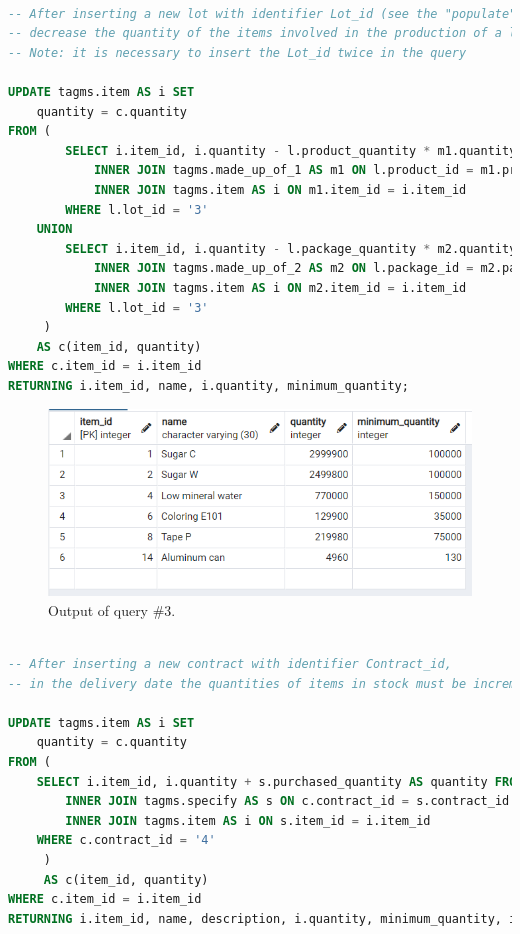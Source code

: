 \newpage

\begin{lstlisting}[language=SQL,
	keywordstyle=\color{blue},
	stringstyle=\color{mauve},
	showstringspaces=false,
	breaklines=true,
	basicstyle=\ttfamily\footnotesize]

-- After inserting a new lot with identifier Lot_id (see the "populate" section)
-- decrease the quantity of the items involved in the production of a lot
-- Note: it is necessary to insert the Lot_id twice in the query

UPDATE tagms.item AS i SET
    quantity = c.quantity
FROM (
        SELECT i.item_id, i.quantity - l.product_quantity * m1.quantity AS quantity FROM tagms.lot AS l
            INNER JOIN tagms.made_up_of_1 AS m1 ON l.product_id = m1.product_id
            INNER JOIN tagms.item AS i ON m1.item_id = i.item_id
        WHERE l.lot_id = '3'
    UNION
        SELECT i.item_id, i.quantity - l.package_quantity * m2.quantity AS quantity FROM tagms.lot AS l
            INNER JOIN tagms.made_up_of_2 AS m2 ON l.package_id = m2.package_id
            INNER JOIN tagms.item AS i ON m2.item_id = i.item_id
        WHERE l.lot_id = '3'
     )
    AS c(item_id, quantity)
WHERE c.item_id = i.item_id
RETURNING i.item_id, name, i.quantity, minimum_quantity;


\end{lstlisting}

\begin{figure}[h!]
	\centering
	\includegraphics{images/q3}
	\caption{Output of query \#3.}
	\label{fig:q3}
\end{figure}

\begin{lstlisting}[language=SQL,
	keywordstyle=\color{blue},
	stringstyle=\color{mauve},
	showstringspaces=false,
	breaklines=true,
	basicstyle=\ttfamily\footnotesize]

-- After inserting a new contract with identifier Contract_id,
-- in the delivery date the quantities of items in stock must be incremented

UPDATE tagms.item AS i SET
    quantity = c.quantity
FROM (
    SELECT i.item_id, i.quantity + s.purchased_quantity AS quantity FROM tagms.contract AS c
        INNER JOIN tagms.specify AS s ON c.contract_id = s.contract_id
        INNER JOIN tagms.item AS i ON s.item_id = i.item_id
    WHERE c.contract_id = '4'
     )
     AS c(item_id, quantity)
WHERE c.item_id = i.item_id
RETURNING i.item_id, name, description, i.quantity, minimum_quantity, item_category_id;

\end{lstlisting}

